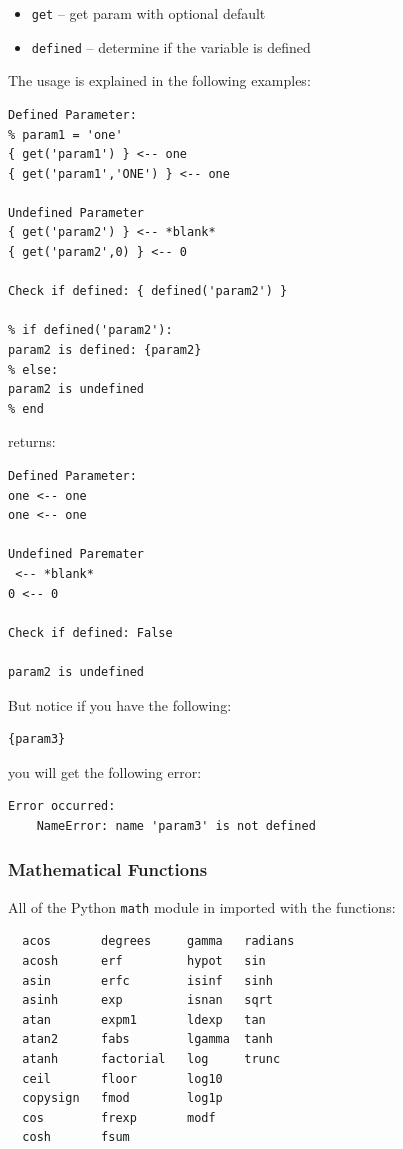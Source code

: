 {\begin{itemize}
\tightlist
\item
  \texttt{get} -- get param with optional default
\item
  \texttt{defined} -- determine if the variable is defined
\end{itemize}

The usage is explained in the following examples:

\begin{verbatim}
Defined Parameter:
% param1 = 'one'
{ get('param1') } <-- one
{ get('param1','ONE') } <-- one

Undefined Parameter
{ get('param2') } <-- *blank*
{ get('param2',0) } <-- 0

Check if defined: { defined('param2') }

% if defined('param2'):
param2 is defined: {param2}
% else:
param2 is undefined
% end
\end{verbatim}

returns:

\begin{verbatim}
Defined Parameter:
one <-- one
one <-- one

Undefined Paremater
 <-- *blank*
0 <-- 0

Check if defined: False

param2 is undefined
\end{verbatim}

But notice if you have the following:

\begin{verbatim}
{param3}
\end{verbatim}

you will get the following error:

\begin{verbatim}
Error occurred:
    NameError: name 'param3' is not defined
\end{verbatim}

\subsubsection{Mathematical Functions}\label{interfaces:mathematical-functions}

All of the Python \texttt{math} module in imported with the functions:

\begin{verbatim}
  acos       degrees     gamma   radians  
  acosh      erf         hypot   sin      
  asin       erfc        isinf   sinh      
  asinh      exp         isnan   sqrt      
  atan       expm1       ldexp   tan       
  atan2      fabs        lgamma  tanh      
  atanh      factorial   log     trunc     
  ceil       floor       log10   
  copysign   fmod        log1p   
  cos        frexp       modf             
  cosh       fsum                               
\end{verbatim}

}
